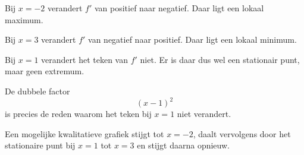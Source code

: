 \documentclass{ximera}
\begin{document}
\begin{oefening}{\oefG}
\begin{oplossing}
Bij $x=-2$ verandert $f'$ van positief naar negatief. Daar ligt een lokaal
maximum.

Bij $x=3$ verandert $f'$ van negatief naar positief. Daar ligt een lokaal
minimum.

Bij $x=1$ verandert het teken van $f'$ niet. Er is daar dus wel een
stationair punt, maar geen extremum.

De dubbele factor
\[
(x-1)^2
\]
is precies de reden waarom het teken bij $x=1$ niet verandert.

Een mogelijke kwalitatieve grafiek stijgt tot $x=-2$, daalt vervolgens
door het stationaire punt bij $x=1$ tot $x=3$ en stijgt daarna opnieuw.

\end{oplossing}

\end{oefening}


\end{document}
